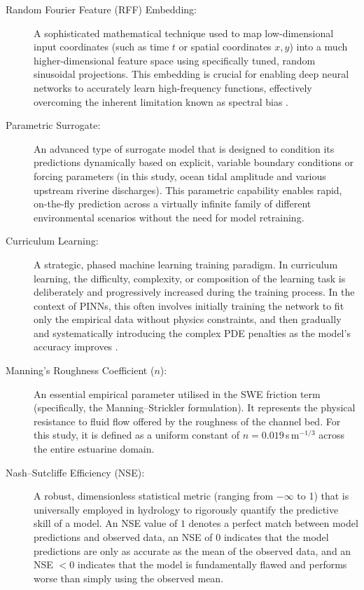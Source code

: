 \begin{description}
    \item[Random Fourier Feature (RFF) Embedding:] A sophisticated mathematical technique used to map low-dimensional input coordinates (such as time $t$ or spatial coordinates $x, y$)
    into a much higher-dimensional feature space using specifically tuned, random sinusoidal
    projections. This embedding is crucial for enabling deep neural networks to accurately learn high-frequency
    functions, effectively overcoming the inherent limitation known as spectral bias \cite{Tancik2020}.

    \item[Parametric Surrogate:] An advanced type of surrogate model that is designed to condition its
    predictions dynamically based on explicit, variable boundary conditions or forcing parameters (in this study, ocean
    tidal amplitude and various upstream riverine discharges). This parametric capability enables rapid, on-the-fly prediction
    across a virtually infinite family of different environmental scenarios without the need for model retraining.

    \item[Curriculum Learning:] A strategic, phased machine learning training paradigm. In curriculum learning, the
    difficulty, complexity, or composition of the learning task is deliberately and progressively increased
    during the training process. In the context of PINNs, this often involves initially training the network to fit only the empirical data without physics constraints, and then gradually and systematically introducing the complex PDE penalties as the model's accuracy improves \cite{Bengio2009}.

    \item[Manning's Roughness Coefficient ($n$):] An essential empirical parameter utilised
    in the SWE friction term (specifically, the Manning--Strickler formulation). It represents
    the physical resistance to fluid flow offered by the roughness of the channel bed. For this study, it is defined as
    a uniform constant of $n = 0.019$\,s\,m$^{-1/3}$ across the entire estuarine domain.

    \item[Nash--Sutcliffe Efficiency (NSE):] A robust, dimensionless statistical metric
    (ranging from $-\infty$ to 1) that is universally employed in hydrology to rigorously quantify the predictive skill of a model. An NSE value of $1$ denotes a perfect match between model predictions and observed data, an NSE of $0$ indicates that the model predictions are only as accurate as the mean of the observed data, and an
    NSE $< 0$ indicates that the model is fundamentally flawed and performs worse than simply using the observed mean.
\end{description}

